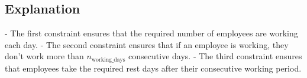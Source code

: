 \documentclass{article}
\begin{document}
\subsection*{Explanation}

- The first constraint ensures that the required number of employees are working each day.
- The second constraint ensures that if an employee is working, they don't work more than \( n_{\text{working\_days}} \) consecutive days.
- The third constraint ensures that employees take the required rest days after their consecutive working period.
\end{document}
